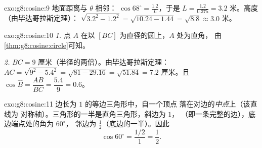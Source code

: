 \begin{solution}{exo:g8:cosine:9}
地面距离与 $\theta$ 相邻：
$\cos 68^\circ = \frac{1.2}{L}$，于是
$L = \frac{1.2}{0.375} = 3.2$ 米。高度（由毕达哥拉斯定理）：
$\sqrt{3.2^2 - 1.2^2} = \sqrt{10.24 - 1.44} = \sqrt{8.8} \approx 3.0$
米。
\end{solution}

\begin{solution}{exo:g8:cosine:10}
\emph{1.} 点 $A$ 在以 $[BC]$ 为直径的圆上，$A$ 处为直角，
由\cref{thm:g8:cosine:circle}可知。

\emph{2.} $BC = 9$ 厘米（半径的两倍）。由毕达哥拉斯定理：
$AC = \sqrt{9^2 - 5.4^2} = \sqrt{81 - 29.16} = \sqrt{51.84} = 7.2$
厘米。且 $\cos\widehat B = \dfrac{AB}{BC} = \dfrac{5.4}{9} = 0.6$。
\end{solution}

\begin{solution}{exo:g8:cosine:11}
边长为 $1$ 的等边三角形中，自一个顶点
落在对边的\emph{中点}上（该直线为
对称轴）。三角形的一半是直角三角形，斜边为 $1$，
（即一条完整的边），底边端点处的角为 $60^\circ$，
邻边为 $\frac12$（底边的一半）。因此
\[
\cos 60^\circ = \frac{1/2}{1} = \frac12 .
\]
\end{solution}

